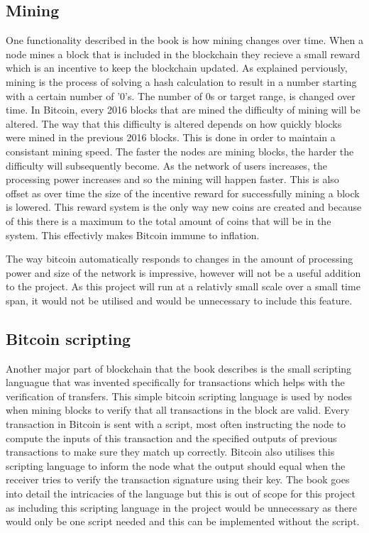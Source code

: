 \documentclass{l4proj}
\begin{document}
\subsection{Mining}
One functionality described in the book is how mining changes over time. When a node mines a block that is included in the
blockchain they recieve a small reward which is an incentive to keep the blockchain updated. As explained perviously,
mining is the process of solving a hash calculation to result in a number starting with a certain number of '0's. The number
of 0s or target range, is changed over time. In Bitcoin, every 2016 blocks that are mined the difficulty of mining will be
altered. The way that this difficulty is altered depends on how quickly blocks were mined in the previous 2016 blocks. This
is done in order to maintain a consistant mining speed. The faster the nodes are mining blocks, the harder the difficulty
will subsequently become. As the network of users increases, the processing power increases and so the mining will happen
faster. This is also offset as over time the size of the incentive reward for successfully mining a block is lowered.
This reward system is the only way new coins are created and because of this there is a maximum to the total amount of coins
that will be in the system. This effectivly makes Bitcoin immune to inflation.

The way bitcoin automatically responds to changes in the amount of processing power and size of the network is impressive,
however will not be a useful addition to the project. As this project will run at a relativly small scale over a small
time span, it would not be utilised and would be unnecessary to include this feature.

\subsection{Bitcoin scripting}
Another major part of blockchain that the book describes is the small scripting languague that was invented specifically for
transactions which helps with the verification of transfers. This simple bitcoin scripting language is used
by nodes when mining blocks to verify that all transactions in the block are valid. Every transaction in Bitcoin is
sent with a script, most often instructing the node to compute the inputs of this transaction and the specified outputs of
previous transactions to make sure they match up correctly. Bitcoin also utilises this scripting language to inform the node
what the output should equal when the receiver tries to verify the transaction signature using their key. The book goes
into detail the intricacies of the language but this is out of scope for this project as including this scripting language
in the project would be unnecessary as there would only be one script needed and this can be implemented without the script.
\end{document}
